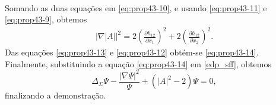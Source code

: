 \begin{demonstracao}
\begin{eqnarray}
\begin{aligned}
\end{aligned}
\end{eqnarray}	
Somando as duas equa\c c\~oes em \eqref{eq:prop43-10}, e usando
\eqref{eq:prop43-11} e \eqref{eq:prop43-9}, obtemos
\begin{eqnarray} \label{eq:prop43-12}
| \nabla |A| |^2 = 2 \left( \frac{\partial h_{12}}{\partial x_1} \right)^2 + 2 \left( \frac{\partial h_{12}}{\partial x_2} \right)^2.
\end{eqnarray}	
Das equa\c c\~oes \eqref{eq:prop43-13} e \eqref{eq:prop43-12}
obtém-se \eqref{eq:prop43-14}. Finalmente, substituindo a
equa\c c\~ao \eqref{eq:prop43-14} em \eqref{edp_sff}, obtemos
\begin{equation*}
\Delta_\Sigma \Psi - \frac{|\nabla \Psi|^2}{\Psi} + (|A|^2 - 2) \Psi = 0,
\end{equation*}
finalizando a demonstra\c c\~ao.
\end{demonstracao}


